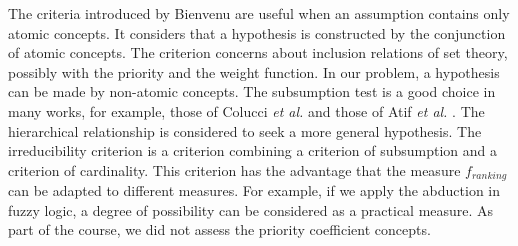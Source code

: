 \documentclass{article}
\begin{document}
The criteria introduced by Bienvenu are useful when an assumption contains only atomic concepts. It considers that a hypothesis is constructed by the conjunction of atomic concepts.
The criterion concerns about inclusion relations of set theory, possibly with the priority and the weight function. In our problem, a hypothesis can be made by non-atomic concepts. The subsumption test is a good choice in many works,
for example, those of Colucci \textit{et al.} \cite{colucci2004uniform} and those of Atif \textit{et al.}  \cite{atif2014explanatory}. 
The hierarchical relationship is considered to seek a more general hypothesis.
The irreducibility criterion is a criterion combining a criterion of subsumption and a criterion of cardinality. This criterion has the advantage that the measure $f_{ranking}$  can be adapted to different measures.
For example, if we apply the abduction in fuzzy logic, a degree of possibility can be considered as a practical measure. As part of the course, we did not assess the priority coefficient
concepts. 

\end{document}
